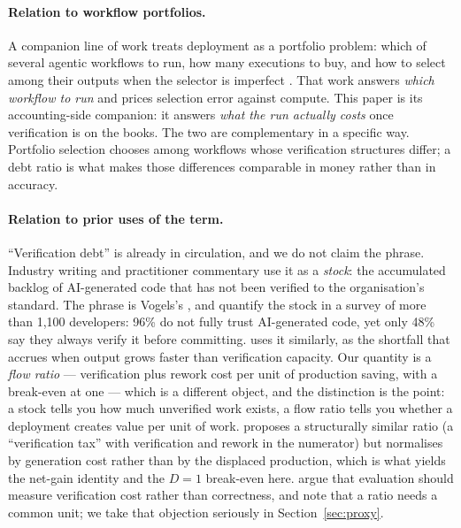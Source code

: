 \documentclass[11pt]{article}
\begin{document}
\paragraph{Relation to workflow portfolios.}
A companion line of work treats deployment as a portfolio problem: which of several agentic
workflows to run, how many executions to buy, and how to select among their outputs when the
selector is imperfect \citep{abdolmaleki2026}. That work answers \emph{which workflow to run} and
prices selection error against compute. This paper is its accounting-side companion: it answers
\emph{what the run actually costs} once verification is on the books. The two are complementary in
a specific way. Portfolio selection chooses among workflows whose verification structures differ;
a debt ratio is what makes those differences comparable in money rather than in accuracy.

\paragraph{Relation to prior uses of the term.}
``Verification debt'' is already in circulation, and we do not claim the phrase. Industry writing
and practitioner commentary use it as a \emph{stock}: the accumulated
backlog of AI-generated code that has not been verified to the organisation's standard.
The phrase is Vogels's \citep{vogels2025}, and \citet{sonar2026} quantify the stock in a survey of more than
1{,}100 developers: 96\% do not fully trust AI-generated code, yet only 48\% say they always
verify it before committing. \citet{agilev2026} uses it similarly, as the shortfall that accrues when output grows faster than
verification capacity. Our quantity is a \emph{flow ratio} --- verification plus rework cost per
unit of production saving, with a break-even at one --- which is a different object, and the
distinction is the point: a stock tells you how much unverified work exists, a flow ratio tells you
whether a deployment creates value per unit of work. \citet{bhati2026} proposes a structurally
similar ratio (a ``verification tax'' with verification and rework in the numerator) but normalises
by generation cost rather than by the displaced production, which is what yields the net-gain
identity and the $D=1$ break-even here. \citet{crescitelli2026} argue that evaluation should measure
verification cost rather than correctness, and note that a ratio needs a common unit; we take that
objection seriously in Section~\ref{sec:proxy}.
\end{document}
